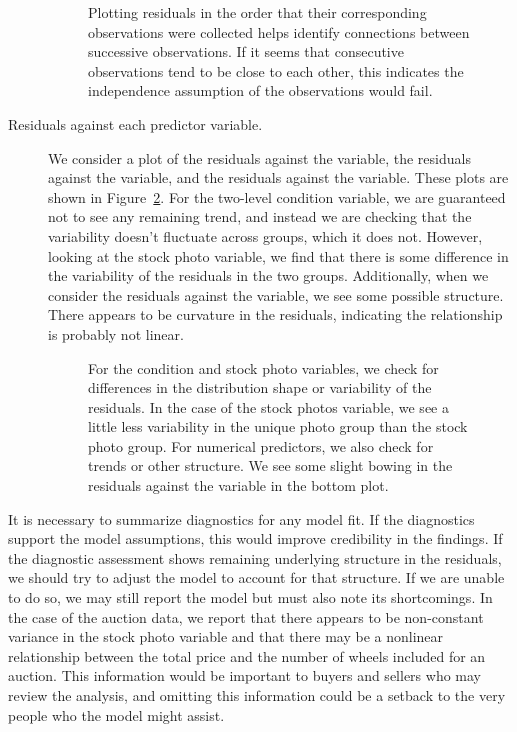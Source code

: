 \begin{description}
\begin{figure}[h]
  \centering
  \caption{Plotting residuals in the order that their
      corresponding observations were collected helps
      identify connections between successive observations.
      If it seems that consecutive observations tend to be
      close to each other, this indicates the independence
      assumption of the observations would fail.}
  \label{mkDiagnosticInOrder}
\end{figure}

\item[Residuals against each predictor variable.] We consider a plot of the residuals against the  variable, the residuals against the  variable, and the residuals against the  variable. These plots are shown in Figure~\ref{mkDiagnosticEvsVariables}. For the two-level condition variable, we are guaranteed not to see any remaining trend, and instead we are checking that the variability doesn't fluctuate across groups, which it does not. However, looking at the stock photo variable, we find that there is some difference in the variability of the residuals in the two groups. Additionally, when we consider the residuals against the  variable, we see some possible structure. There appears to be curvature in the residuals, indicating the relationship is probably not linear.

\begin{figure}
  \centering
  \caption{For the condition and stock photo variables,
      we check for differences in the distribution shape
      or variability of the residuals.
      In the case of the stock photos variable, we see
      a little less variability in the unique photo group
      than the stock photo group.
      For numerical predictors, we also check for trends
      or other structure.
      We see some slight bowing in the residuals against
      the  variable in the bottom plot.}
  \label{mkDiagnosticEvsVariables}
\end{figure}

\end{description}

It is necessary to summarize diagnostics for any model fit. If the diagnostics support the model assumptions, this would improve credibility in the findings. If the diagnostic assessment shows remaining underlying structure in the residuals, we should try to adjust the model to account for that structure. If we are unable to do so, we may still report the model but must also note its shortcomings. In the case of the auction data, we report that there appears to be non-constant variance in the stock photo variable and that there may be a nonlinear relationship between the total price and the number of wheels included for an auction. This information would be important to buyers and sellers who may review the analysis, and omitting this information could be a setback to the very people who the model might assist.

